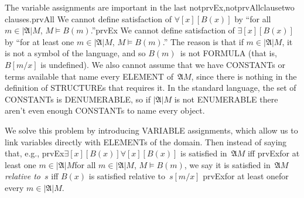 \documentclass[10pt,a4paper]{article}
\newcommand*{\olup}[1]{\MakeUppercase{#1}}
\theoremstyle{plain}
\theoremstyle{definition}
\theoremstyle{remark}
\newenvironment{explain}{}{}
\providecommand{\lforall}{\mathord{\forall}}
\providecommand{\lexists}{\mathord{\exists}}
\providecommand{\Subst}[3]{#1[#2/#3]}
\providecommand{\Struct}{\ensuremath{\mathfrak{A}}}
\providecommand{\Domain}{\ensuremath{|\mathfrak{A}|}}
\providecommand{\Sat}[2]{\ensuremath{#1 \models #2}}
\providecommand{\iftag}[1]{#1}
\providecommand{\iftag}{}
\begin{document}
\begin{explain}
The variable assignments are important in the last
\iftag{notprvEx,notprvAll}{clause}{two clauses}.\iftag{prvAll}{ We
cannot define satisfaction of $\lforall[x][B(x)]$ by ``for all $m \in
\Domain{M}$, $\Sat{M}{B(m)}$.''}{}\iftag{prvEx}{ We cannot define
satisfaction of $\lexists[x][B(x)]$ by ``for at least one $m \in
\Domain{M}$, $\Sat{M}{B(m)}$.''}{} The reason is that if $m \in
\Domain M$, it is not a symbol of the language, and so $B(m)$~is not
\olup{formula} (that is, $\Subst{B}{m}{x}$ is undefined).  We also
cannot assume that we have \olup{constant}s or terms available that name
every \olup{element} of~$\Struct{M}$, since there is nothing in the
definition of \olup{structure}s that requires it.  In the standard
language, the set of \olup{constant}s is \olup{denumerable}, so if
$\Domain{M}$ is not \olup{enumerable} there aren't even enough
\olup{constant}s to name every object. 

We solve this problem by introducing \olup{variable} assignments, which
allow us to link variables directly with \olup{element}s of the domain.
Then instead of saying that, e.g.,
\iftag{prvEx}{$\lexists[x][B(x)]$}{$\lforall[x][B(x)]$} is satisfied
in~$\Struct M$ iff \iftag{prvEx}{for at least one $m \in
\Domain{M}$}{for all $m \in \Domain{M}$, $\Sat{M}{B(m)}$}, we say it
is satisfied in~$\Struct M$ \emph{relative to}~$s$ iff $B(x)$ is
satisfied relative to~$\Subst{s}{m}{x}$ \iftag{prvEx}{for at least
one}{for every} $m \in \Domain M$.
\end{explain}
\end{document}
